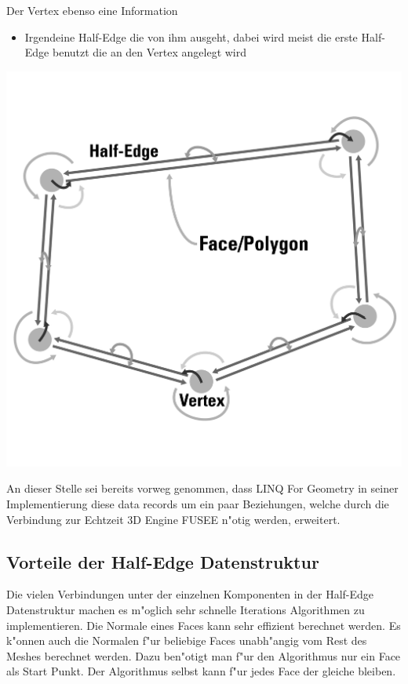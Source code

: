 \documentclass[pagesize, paper=a4, fontsize=12pt,titlepage=true, headings=small, headnosepline, abstractoff, liststotoc, nochapterprefix, plainheadsepline]{scrreprt}
\newcommand{\LFGS}{LINQ For Geometry }
\newcommand{\HES}{Half-Edge Datenstruktur }
\begin{document}
Der Vertex ebenso eine Information
\begin{itemize}
\item Irgendeine Half-Edge die von ihm ausgeht, dabei wird meist die erste Half-Edge benutzt die an den Vertex angelegt wird
\end{itemize}

\includegraphics[width=\linewidth]{../Bilder/hesBeziehungen}
\label{pic:polyConnections} 

An dieser Stelle sei bereits vorweg genommen, dass \LFGS in seiner Implementierung diese data records um ein paar Beziehungen, welche durch die Verbindung zur Echtzeit 3D Engine FUSEE n"otig werden, erweitert.

		\subsection {Vorteile der \HES}
			Die vielen Verbindungen unter der einzelnen Komponenten in der \HES machen es m"oglich sehr schnelle Iterations Algorithmen zu implementieren. Die Normale eines Faces kann sehr effizient berechnet werden. Es k"onnen auch die Normalen f"ur beliebige Faces unabh"angig vom Rest des Meshes berechnet werden. Dazu ben"otigt man f"ur den Algorithmus nur ein Face als Start Punkt. Der Algorithmus selbst kann f"ur jedes Face der gleiche bleiben.
\end{document}
